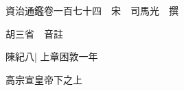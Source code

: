 






























































資治通鑑卷一百七十四　宋　司馬光　撰

胡三省　音註

陳紀八|{
	上章困敦一年}


高宗宣皇帝下之上


